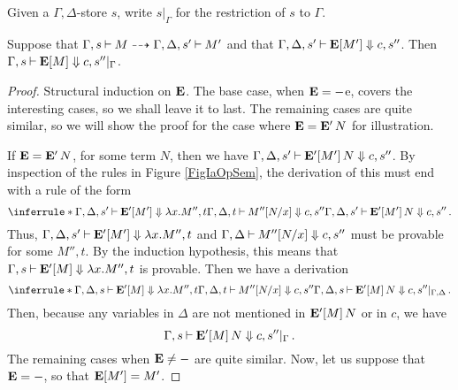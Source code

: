 Given a $\Gamma,\Delta$-store $s$, write $s\vert_{\Gamma}$ for the restriction of $s$ to $\Gamma$.
\begin{lemma}
  Suppose that $\Gamma,s\mathbin{\vdash} M \dashrightarrow \Gamma,\Delta,s'\mathbin{\vdash} M'$ and that $\Gamma,\Delta,s'\mathbin{\vdash} {\mathbf{E}}[M'] \Downarrow c,s''$.  
  Then $\Gamma,s\mathbin{\vdash} {\mathbf{E}}[M]\Downarrow c,s''\vert_\Gamma$.
  \label{LemSmallToBig}
\end{lemma}
\begin{proof}
  Structural induction on ${\mathbf{E}}$.
  The base case, when ${\mathbf{E}}=-$e, covers the interesting cases, so we shall leave it to last.
  The remaining cases are quite similar, so we will show the proof for the case where ${\mathbf{E}} = {\mathbf{E}}'\,N$ for illustration.

  If ${\mathbf{E}}={\mathbf{E}}'\,N$, for some term $N$, then we have $\Gamma,\Delta,s'\mathbin{\vdash} {\mathbf{E}}'[M']\,N\Downarrow c,s''$.  
  By inspection of the rules in Figure \ref{FigIaOpSem}, the derivation of this must end with a rule of the form
  \[
    \inferrule*{\Gamma,\Delta,s'\ts \EE'[M'] \converges \lambda x.M'',t \\ \Gamma,\Delta,t \ts M''[N/x] \converges c,s''}
    {\Gamma,\Delta,s'\ts \EE'[M']\,N \converges c,s''}\,.
    \]
  Thus, $\Gamma,\Delta,s'\mathbin{\vdash} {\mathbf{E}}'[M']\Downarrow \lambda x.M'',t$ and $\Gamma,\Delta\mathbin{\vdash} M''[N/x]\Downarrow c,s''$ must be provable for some $M'',t$.
  By the induction hypothesis, this means that $\Gamma,s\mathbin{\vdash} {\mathbf{E}}'[M]\Downarrow \lambda x.M'',t$ is provable.
  Then we have a derivation
  \[
    \inferrule*{\Gamma,\Delta,s\ts \EE'[M] \converges \lambda x.M'',t \\ \Gamma,\Delta,t \ts M''[N/x] \converges c,s''}
    {\Gamma,\Delta,s\ts \EE'[M]\,N\converges c,s''\vert_{\Gamma,\Delta}}\,.
    \]
  Then, because any variables in $\Delta$ are not mentioned in ${\mathbf{E}}'[M]\,N$ or in $c$, we have
  \[
    \Gamma,s\mathbin{\vdash} {\mathbf{E}}'[M]\,N\Downarrow c,s''\vert_\Gamma\,.
    \]
  The remaining cases when ${\mathbf{E}}\ne-$ are quite similar.
  Now, let us suppose that ${\mathbf{E}}=-$, so that ${\mathbf{E}}[M']=M'$.  


\end{proof}
